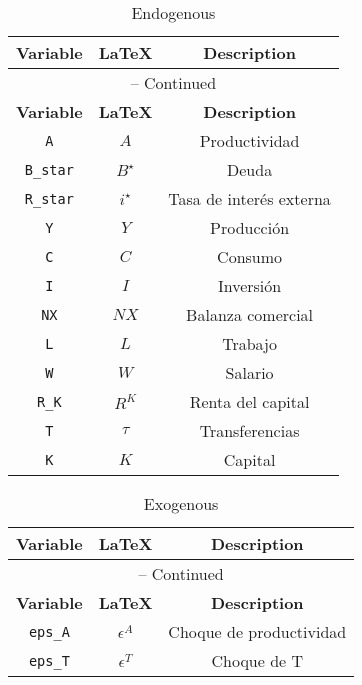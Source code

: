 \begin{center}
\begin{longtable}{ccc}
\caption{Endogenous}\\%
\hline%
\multicolumn{1}{c}{\textbf{Variable}} &
\multicolumn{1}{c}{\textbf{\LaTeX}} &
\multicolumn{1}{c}{\textbf{Description}}\\%
\hline\hline%
\endfirsthead
\multicolumn{3}{c}{{\tablename} \thetable{} -- Continued}\\%
\hline%
\multicolumn{1}{c}{\textbf{Variable}} &
\multicolumn{1}{c}{\textbf{\LaTeX}} &
\multicolumn{1}{c}{\textbf{Description}}\\%
\hline\hline%
\endhead
\texttt{A} & $A$ & Productividad\\
\texttt{B\_star} & $B^{\star}$ & Deuda\\
\texttt{R\_star} & $i^{\star}$ & Tasa de interés externa\\
\texttt{Y} & $Y$ & Producción\\
\texttt{C} & $C$ & Consumo\\
\texttt{I} & $I$ & Inversión\\
\texttt{NX} & $NX$ & Balanza comercial\\
\texttt{L} & $L$ & Trabajo\\
\texttt{W} & $W$ & Salario\\
\texttt{R\_K} & $R^{K}$ & Renta del capital\\
\texttt{T} & $\tau$ & Transferencias\\
\texttt{K} & $K$ & Capital\\
\hline%
\end{longtable}
\end{center}
\begin{center}
\begin{longtable}{ccc}
\caption{Exogenous}\\%
\hline%
\multicolumn{1}{c}{\textbf{Variable}} &
\multicolumn{1}{c}{\textbf{\LaTeX}} &
\multicolumn{1}{c}{\textbf{Description}}\\%
\hline\hline%
\endfirsthead
\multicolumn{3}{c}{{\tablename} \thetable{} -- Continued}\\%
\hline%
\multicolumn{1}{c}{\textbf{Variable}} &
\multicolumn{1}{c}{\textbf{\LaTeX}} &
\multicolumn{1}{c}{\textbf{Description}}\\%
\hline\hline%
\endhead
\texttt{eps\_A} & $\epsilon^{A}$ & Choque de productividad\\
\texttt{eps\_T} & $\epsilon^{T}$ & Choque de T\\
\hline%
\end{longtable}
\end{center}
